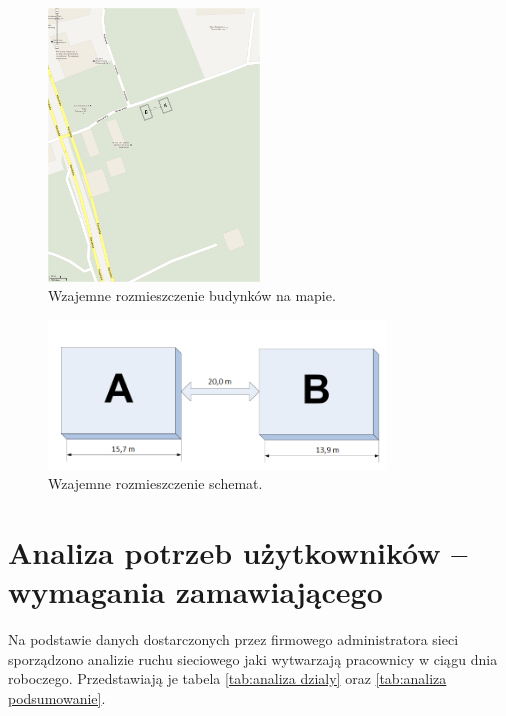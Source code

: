 \documentclass{report}
\begin{document}

\begin{figure}[H]
  \centering
      \includegraphics[width=0.5\textwidth]{./obrazki/rzut_terenowy.png}
    \caption{Wzajemne rozmieszczenie budynków na mapie.}
\end{figure}

\begin{figure}[H]
  \centering
      \includegraphics[width=0.8\textwidth]{./obrazki/rozmieszczenie_budynkow.jpeg}
    \caption{Wzajemne rozmieszczenie schemat.}
\end{figure}



\chapter{Analiza potrzeb użytkowników – wymagania zamawiającego}
Na podstawie danych dostarczonych przez firmowego administratora sieci sporządzono analizie ruchu sieciowego jaki wytwarzają
pracownicy w ciągu dnia roboczego. Przedstawiają je tabela 
\ref{tab:analiza dzialy} oraz \ref{tab:analiza podsumowanie}.
\end{document}
